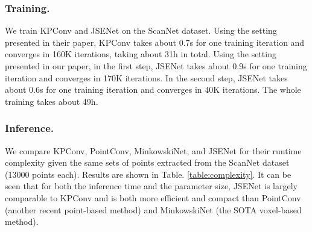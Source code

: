 \documentclass[runningheads]{llncs}
\begin{document}
\subsubsection{Training.} We train KPConv and JSENet on the ScanNet dataset. Using the setting presented in their paper, KPConv takes about 0.7s for one training iteration and converges in 160K iterations, taking about 31h in total. Using the setting presented in our paper, in the first step, JSENet takes about 0.9s for one training iteration and converges in 170K iterations. In the second step, JSENet takes about 0.6s for one training iteration and converges in 40K iterations. The whole training takes about 49h.

\begin{table}
\small
\begin{center}
\caption{Comparison on runtime complexity of JSENet against state-of-the-art methods.
}
\label{table:complexity}
\end{center}
\end{table}
\vspace{-5mm}

\subsubsection{Inference.}

We compare KPConv, PointConv, MinkowskiNet, and JSENet for their runtime complexity given the same sets of points extracted from the ScanNet dataset (13000 points each). Results are shown in Table. \ref{table:complexity}. It can be seen that for both the inference time and the parameter size, JSENet is largely comparable to KPConv and is both more efficient and compact than PointConv (another recent point-based method) and MinkowskiNet (the SOTA voxel-based method).
\end{document}
